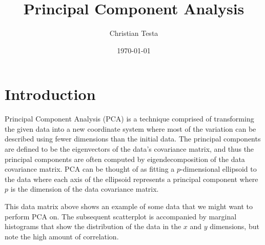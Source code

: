 \documentclass{tufte-handout}
\begin{document}
\title{Principal Component Analysis}
\author{Christian Testa}
\date{\today}

\maketitle

\section{Introduction}




Principal Component Analysis (PCA)\citep{wikiPCA} is a technique comprised of transforming the 
given data into a new coordinate system where most of the variation can be 
described using fewer dimensions than the initial data. The principal components are defined to be the eigenvectors of the data's covariance matrix, and thus the principal components are often computed by eigendecomposition of the data
covariance matrix. PCA can be thought of as fitting a $p$-dimensional ellipsoid to the data where each axis of the ellipsoid represents a principal component where $p$ is the dimension of the data covariance matrix.  

\begin{marginfigure}
\caption{This data matrix above shows an example of some data that we might want to perform PCA on. The subsequent scatterplot is accompanied by marginal histograms that show the distribution of the data in the $x$ and $y$ dimensions, but note the high amount of correlation.}
\end{marginfigure}
\end{document}
